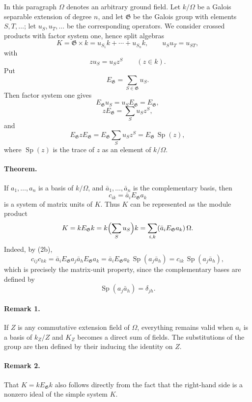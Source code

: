 \documentclass[11pt]{article}
\providecommand{\Sp}{\operatorname{Sp}}
\providecommand{\Gg}{\mathfrak G}
\begin{document}
In this paragraph \(\Omega\) denotes an arbitrary ground field. Let \(k/\Omega\) be a Galois separable extension of degree \(n\), and let \(\Gg\) be the Galois group with elements \(S,T,\ldots\); let \(u_S,u_T,\ldots\) be the corresponding operators. We consider crossed products with factor system one, hence split algebras
\[
        K=\Gg\times k=u_{S_1}k+\cdots+u_{S_n}k,\qquad
        u_Su_T=u_{ST},
\]
with
\[
        z u_S=u_S z^S \qquad(z\in k).
\]
Put
\[
        E_\Gg=\sum_{S\in\Gg}u_S.
\]
Then factor system one gives
\[
        E_\Gg u_S=u_SE_\Gg=E_\Gg,                             \tag{1}
\]
\[
        zE_\Gg=\sum_Su_Sz^S,                                  \tag{2a}
\]
and
\[
        E_\Gg z E_\Gg
        =E_\Gg\sum_Su_Sz^S
        =E_\Gg\,\Sp(z),                                      \tag{2b}
\]
where \(\Sp(z)\) is the trace of \(z\) as an element of \(k/\Omega\).

\paragraph{Theorem.}
If \(a_1,\ldots,a_n\) is a basis of \(k/\Omega\), and \(\bar a_1,\ldots,\bar a_n\) is the complementary basis, then
\[
        c_{ik}=\bar a_iE_\Gg a_k
\]
is a system of matrix units of \(K\). Thus \(K\) can be represented as the module product
\[
        K=kE_\Gg k
          =k\Bigl(\sum_Su_S\Bigr)k
          =\sum_{i,k}(\bar a_iE_\Gg a_k)\,\Omega .
\]
Indeed, by (2b),
\[
        c_{ij}c_{hk}
        =\bar a_iE_\Gg a_j\bar a_hE_\Gg a_k
        =\bar a_iE_\Gg a_k\,\Sp(a_j\bar a_h)
        =c_{ik}\,\Sp(a_j\bar a_h),
\]
which is precisely the matrix-unit property, since the complementary bases are defined by
\[
        \Sp(a_j\bar a_h)=\delta_{jh}.
\]

\paragraph{Remark 1.}
If \(Z\) is any commutative extension field of \(\Omega\), everything remains valid when \(a_i\) is a basis of \(k_Z/Z\) and \(K_Z\) becomes a direct sum of fields. The substitutions of the group are then defined by their inducing the identity on \(Z\).

\paragraph{Remark 2.}
That \(K=kE_\Gg k\) also follows directly from the fact that the right-hand side is a nonzero ideal of the simple system \(K\).
\end{document}
